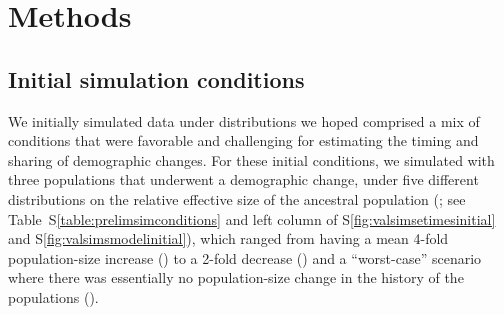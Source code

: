 \section{Methods}

\subsection{Initial simulation conditions}

We initially simulated data under distributions we hoped comprised a mix of
conditions that were favorable and challenging for estimating the timing and
sharing of demographic changes.
For these initial conditions, we simulated \datasets with three populations
that underwent a demographic change, under five different distributions on the
relative effective size of the ancestral population
(\rootrelativepopsize;
see Table~S\ref{table:prelimsimconditions} and left column of
\figs S\ref{fig:valsimsetimesinitial} and S\ref{fig:valsimsmodelinitial}),
which ranged from having a mean 4-fold population-size increase (\psimfourinc)
to a 2-fold decrease (\psimtwodec) and a ``worst-case'' scenario
where there was essentially no population-size change in the
history of the populations (\psimnochange).



